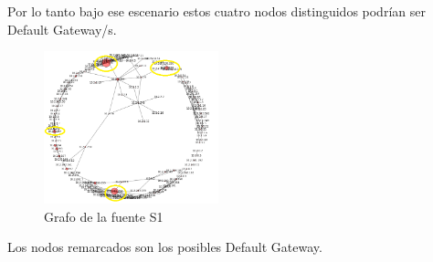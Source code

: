 Por lo tanto bajo ese escenario estos cuatro nodos distinguidos podrían ser Default Gateway/s. 


\begin{figure}[h]
  \centering
    \includegraphics[width=0.45\textwidth]{grafo-red-labos-destacados.png}
  \caption{Grafo de la fuente S1}
  \label{grafo-s1}
\end{figure}

Los nodos remarcados son los posibles Default Gateway.